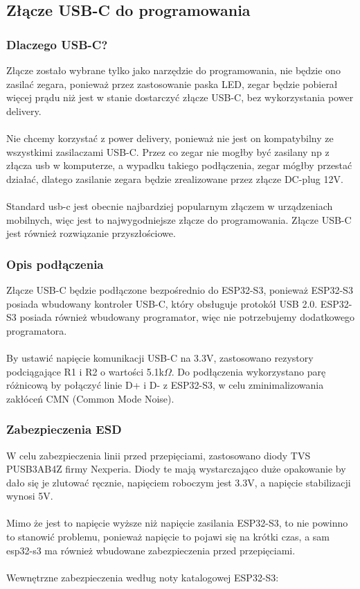 \documentclass{article}
\begin{document}
\subsection{Złącze USB-C do programowania}
\subsubsection{Dlaczego USB-C?}
Złącze zostało wybrane tylko jako narzędzie do programowania, nie będzie ono zasilać zegara, ponieważ przez zastosowanie paska LED, zegar będzie pobierał więcej prądu niż jest w stanie dostarczyć złącze USB-C, 
bez wykorzystania power delivery.
\\\\
Nie chcemy korzystać z power delivery, ponieważ nie jest on kompatybilny ze wszystkimi zasilaczami USB-C. Przez co zegar nie mogłby być zasilany np z złącza usb w komputerze,
a wypadku takiego podłączenia, zegar mógłby przestać działać, dlatego zasilanie zegara będzie zrealizowane przez złącze DC-plug 12V. 
\\\\
Standard usb-c jest obecnie najbardziej popularnym złączem w urządzeniach mobilnych,
więc jest to najwygodniejsze złącze do programowania. Złącze USB-C jest również rozwiązanie przyszłościowe.

\subsubsection{Opis podłączenia}
Złącze USB-C będzie podłączone bezpośrednio do ESP32-S3, ponieważ ESP32-S3 posiada wbudowany kontroler USB-C, 
który obsługuje protokół USB 2.0. ESP32-S3 posiada również wbudowany programator, więc nie potrzebujemy dodatkowego programatora.
\\\\
By ustawić napięcie komunikacji USB-C na 3.3V, zastosowano rezystory podciągające R1 i R2 o wartości 5.1k$\Omega$.
Do podłączenia wykorzystano parę różnicową by połączyć linie D+ i D- z ESP32-S3, w celu zminimalizowania zakłóceń CMN (Common Mode Noise).

\subsubsection{Zabezpieczenia ESD}

W celu zabezpieczenia linii przed przepięciami, zastosowano diody TVS PUSB3AB4Z firmy Nexperia. Diody te mają wystarczająco duże opakowanie by dało się je zlutować ręcznie, napięciem roboczym jest 3.3V,
a napięcie stabilizacji wynosi 5V. 
\\\\
Mimo że jest to napięcie wyższe niż napięcie zasilania ESP32-S3, to nie powinno to stanowić problemu, 
ponieważ napięcie to pojawi się na krótki czas, a sam esp32-s3 ma również wbudowane zabezpieczenia przed przepięciami.
\\\\
Wewnętrzne zabezpieczenia według noty katalogowej ESP32-S3:
\end{document}
